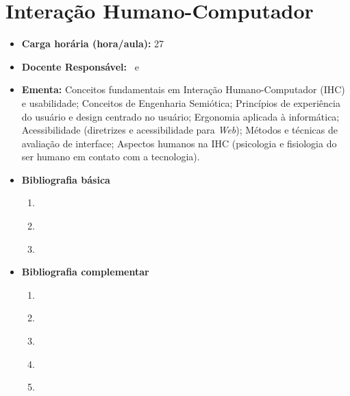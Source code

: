 \documentclass[11pt,fleqn]{book} %
\begin{document}
\section{Interação Humano-Computador}\label{4_ihc}
\begin{itemize}
	\item \textbf{Carga horária (hora/aula):} 27
	\item \textbf{Docente Responsável:}~ e ~
	\item \textbf{Ementa:} 
	Conceitos fundamentais em Interação Humano-Computador (IHC) e usabilidade;
	Conceitos de Engenharia Semiótica;
	Princípios de experiência do usuário e design centrado no usuário;
	Ergonomia aplicada à informática;
	Acessibilidade (diretrizes e acessibilidade para \textit{Web});
	Métodos e técnicas de avaliação de interface;
	Aspectos humanos na IHC (psicologia e fisiologia do ser humano em contato com a tecnologia).
	\item \textbf{Bibliografia básica}
	\begin{enumerate}
		\item \cite{nielsen_2007}
		\item \cite{Peirce2010}
		\item \cite{castells_2003}
	\end{enumerate}
	\item \textbf{Bibliografia complementar}
	\begin{enumerate}
		\item \cite{audrei_2009}
		\item \cite{hogan_2011}
		\item \cite{steven_2001}
		\item \cite{guerin_2001}
		\item \cite{sommerville2011engenharia}
	\end{enumerate} 
\end{itemize}

\newpage
\end{document}
